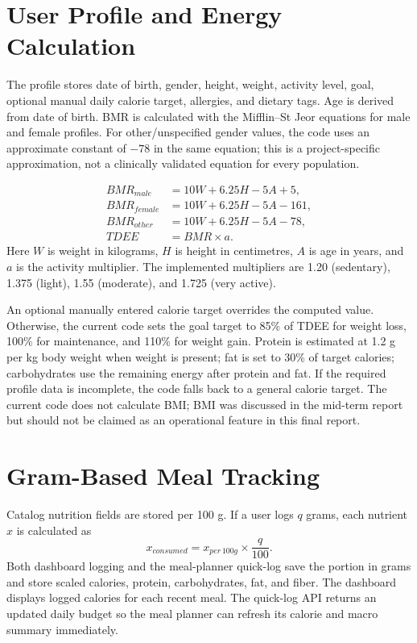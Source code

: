 \documentclass[12pt,a4paper]{report}
\begin{document}
\section{User Profile and Energy Calculation}
The profile stores date of birth, gender, height, weight, activity level, goal, optional
manual daily calorie target, allergies, and dietary tags. Age is derived from date of
birth. BMR is calculated with the Mifflin--St Jeor equations for male and female
profiles. For other/unspecified gender values, the code uses an approximate constant of
$-78$ in the same equation; this is a project-specific approximation, not a clinically
validated equation for every population.

\begin{align}
BMR_{male} &= 10W + 6.25H - 5A + 5,\\
BMR_{female} &= 10W + 6.25H - 5A - 161,\\
BMR_{other} &= 10W + 6.25H - 5A - 78,\\
TDEE &= BMR \times a.
\end{align}
Here $W$ is weight in kilograms, $H$ is height in centimetres, $A$ is age in years, and
$a$ is the activity multiplier. The implemented multipliers are 1.20 (sedentary), 1.375
(light), 1.55 (moderate), and 1.725 (very active).

An optional manually entered calorie target overrides the computed value. Otherwise,
the current code sets the goal target to 85\% of TDEE for weight loss, 100\% for
maintenance, and 110\% for weight gain. Protein is estimated at 1.2 g per kg body
weight when weight is present; fat is set to 30\% of target calories; carbohydrates use
the remaining energy after protein and fat. If the required profile data is incomplete,
the code falls back to a general calorie target. The current code does not calculate BMI;
BMI was discussed in the mid-term report but should not be claimed as an operational
feature in this final report.

\section{Gram-Based Meal Tracking}
Catalog nutrition fields are stored per 100 g. If a user logs $q$ grams, each nutrient $x$
is calculated as
\begin{equation}
x_{consumed} = x_{per\,100g} \times \frac{q}{100}.
\end{equation}
Both dashboard logging and the meal-planner quick-log save the portion in grams and
store scaled calories, protein, carbohydrates, fat, and fiber. The dashboard displays
logged calories for each recent meal. The quick-log API returns an updated daily budget
so the meal planner can refresh its calorie and macro summary immediately.
\end{document}
